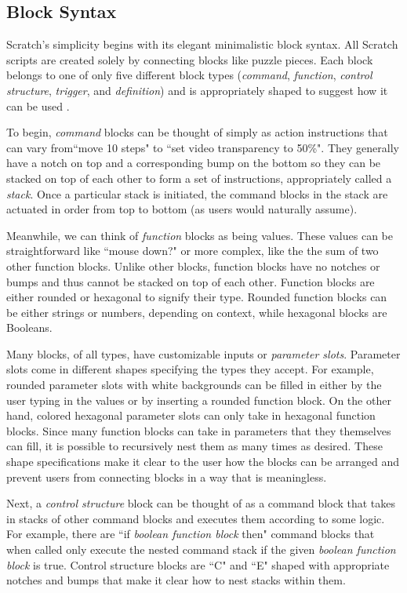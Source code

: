 \subsection{Block Syntax}

Scratch's simplicity begins with its elegant minimalistic block syntax. All Scratch scripts are created solely by connecting blocks like puzzle pieces. Each block belongs to one of only five different block types (\emph{command}, \emph{function}, \emph{control structure}, \emph{trigger}, and \emph{definition}) and is appropriately shaped to suggest how it can be used \cite{Maloney}.

To begin, \emph{command} blocks can be thought of simply as action instructions that can vary from``move 10 steps" to ``set video transparency to 50\%". They generally have a notch on top and a corresponding bump on the bottom so they can be stacked on top of each other to form a set of instructions, appropriately called a \emph{stack}. Once a particular stack is initiated, the command blocks in the stack are actuated in order from top to bottom (as users would naturally assume).

Meanwhile, we can think of \emph{function} blocks as being values. These values can be straightforward like ``mouse down?" or more complex, like the the sum of two other function blocks. Unlike other blocks, function blocks have no notches or bumps and thus cannot be stacked on top of each other. Function blocks are either rounded or hexagonal to signify their type. Rounded function blocks can be either strings or numbers, depending on context, while hexagonal blocks are Booleans. 

Many blocks, of all types, have customizable inputs or \emph{parameter slots}. Parameter slots come in different shapes specifying the types they accept. For example, rounded parameter slots with white backgrounds can be filled in either by the user typing in the values or by inserting a rounded function block. On the other hand, colored hexagonal parameter slots can only take in hexagonal function blocks. Since many function blocks can take in parameters that they themselves can fill, it is possible to recursively nest them as many times as desired. These shape specifications make it clear to the user how the blocks can be arranged and prevent users from connecting blocks in a way that is meaningless.

Next, a \emph{control structure} block can be thought of as a command block that takes in stacks of other command blocks and executes them according to some logic. For example, there are ``if \emph{boolean function block} then" command blocks that when called only execute the nested command stack if the given \emph{boolean function block} is true. Control structure blocks are ``C" and ``E" shaped with appropriate notches and bumps that make it clear how to nest stacks within them.

